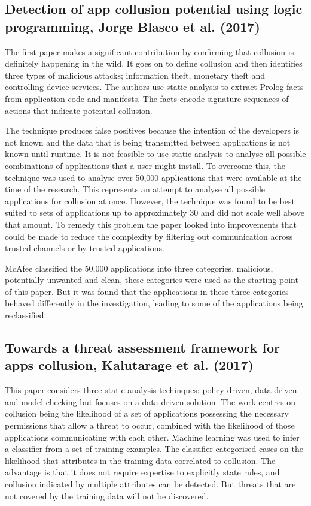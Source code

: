 \subsection{Detection of app collusion potential using logic programming, Jorge Blasco et al. (2017) \cite{PrologAppCollusion}}

The first paper makes a significant contribution by confirming that collusion is definitely happening in the wild.  It goes on to define collusion and then identifies three types of malicious attacks; information theft, monetary theft and controlling device services.  The authors use static analysis to extract Prolog facts from application code and manifests.  The facts encode signature sequences of actions that indicate potential collusion.  

The technique produces false positives because the intention of the developers is not known and the data that is being transmitted between applications is not known until runtime.  It is not feasible to use static analysis to analyse all possible combinations of applications that a user might install.  To overcome this, the technique was used to analyse over 50,000 applications that were available at the time of the research.  This represents an attempt to analyse all possible applications for collusion at once.  However, the technique was found to be best suited to sets of applications up to approximately 30 and did not scale well above that amount.  To remedy this problem the paper looked into improvements that could be made to reduce the complexity by filtering out communication across trusted channels or by trusted applications.

McAfee classified the 50,000 applications into three categories, malicious, potentially unwanted and clean, these categories were used as the starting point of this paper.  But it was found that the applications in these three categories behaved differently in the investigation, leading to some of the applications being reclassified.

\subsection{Towards a threat assessment framework for apps collusion, Kalutarage et al. (2017) \cite{ThreatAssesmentAppCollusion}}

This paper considers three static analysis techinques: policy driven, data driven and model checking but focuses on a data driven solution.  The work centres on collusion being the likelihood of a set of applications possessing the necessary permissions that allow a threat to occur, combined with the likelihood of those applications communicating with each other.   Machine learning was used to infer a classifier from a set of training examples.  The classifier categorised cases on the likelihood that attributes in the training data correlated to collusion.  The advantage is that it does not require expertise to explicitly state rules, and collusion indicated by multiple attributes can be detected.  But threats that are not covered by the training data will not be discovered.


